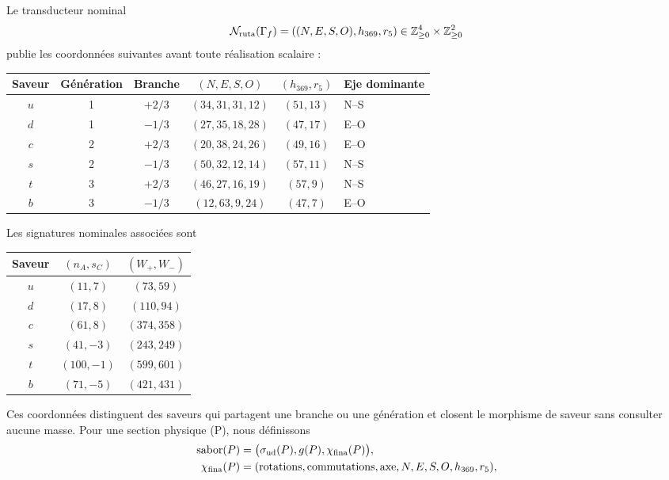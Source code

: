 Le transducteur nominal
\begin{equation}
 \mathcal N_{\rm ruta}(\Gamma_f)
 =((N,E,S,O),h_{369},r_5)
 \in\mathbb Z_{\ge0}^{4}\times\mathbb Z_{\ge0}^{2}
 \label{eq:transductor-nominal-quark-rev2}
\end{equation}
publie les coordonnées suivantes avant toute réalisation scalaire :
\begin{center}
\small
\begin{tabularx}{0.96\textwidth}{@{}c c c c c X@{}}
\toprule
\textbf{Saveur} & \textbf{Génération} & \textbf{Branche} &
\textbf{\((N,E,S,O)\)} & \textbf{\((h_{369},r_5)\)} &
\textbf{Eje dominante}\\
\midrule
\(u\)&1&\(+2/3\)&\((34,31,31,12)\)&\((51,13)\)&N--S\\
\(d\)&1&\(-1/3\)&\((27,35,18,28)\)&\((47,17)\)&E--O\\
\(c\)&2&\(+2/3\)&\((20,38,24,26)\)&\((49,16)\)&E--O\\
\(s\)&2&\(-1/3\)&\((50,32,12,14)\)&\((57,11)\)&N--S\\
\(t\)&3&\(+2/3\)&\((46,27,16,19)\)&\((57,9)\)&N--S\\
\(b\)&3&\(-1/3\)&\((12,63,9,24)\)&\((47,7)\)&E--O\\
\bottomrule
\end{tabularx}
\end{center}
Les signatures nominales associées sont
\begin{center}
\small
\begin{tabular}{@{}c c c@{}}
\toprule
\textbf{Saveur} & \textbf{\((n_A,s_C)\)} & \textbf{\((W_+,W_-)\)}\\
\midrule
\(u\)&\((11,7)\)&\((73,59)\)\\
\(d\)&\((17,8)\)&\((110,94)\)\\
\(c\)&\((61,8)\)&\((374,358)\)\\
\(s\)&\((41,-3)\)&\((243,249)\)\\
\(t\)&\((100,-1)\)&\((599,601)\)\\
\(b\)&\((71,-5)\)&\((421,431)\)\\
\bottomrule
\end{tabular}
\end{center}
Ces coordonnées distinguent des saveurs qui partagent une branche ou une génération et closent
le morphisme de saveur sans consulter aucune masse. Pour une section physique (P),
nous définissons
\begin{equation}
 \begin{aligned}
 \operatorname{sabor}(P)
 &=\bigl(\sigma_{\rm ud}(P),g(P),\chi_{\rm fina}(P)\bigr),\\
 \chi_{\rm fina}(P)
 &=(\text{rotations},\text{commutations},\text{axe},N,E,S,O,h_{369},r_5),
 \end{aligned}
 \label{eq:morfismo-sabor-ruta-cerrado-rev2}
\end{equation}
